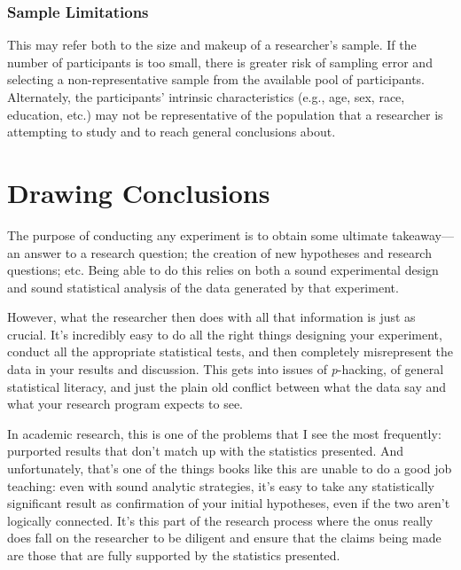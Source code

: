 \subsubsection{Sample Limitations}
This may refer both to the size and makeup of a researcher's sample. If the number of participants is too small, there is greater risk of sampling error and selecting a non-representative sample from the available pool of participants. Alternately, the participants' intrinsic characteristics (e.g., age, sex, race, education, etc.) may not be representative of the population that a researcher is attempting to study and to reach general conclusions about.

\section{Drawing Conclusions}

The purpose of conducting any experiment is to obtain some ultimate takeaway---an answer to a research question; the creation of new hypotheses and research questions; etc. Being able to do this relies on both a sound experimental design and sound statistical analysis of the data generated by that experiment.

However, what the researcher then does with all that information is just as crucial. It's incredibly easy to do all the right things designing your experiment, conduct all the appropriate statistical tests, and then completely misrepresent the data in your results and discussion. This gets into issues of \textit{p}-hacking, of general statistical literacy, and just the plain old conflict between what the data say and what your research program expects to see.

In academic research, this is one of the problems that I see the most frequently: purported results that don't match up with the statistics presented. And unfortunately, that's one of the things books like this are unable to do a good job teaching: even with sound analytic strategies, it's easy to take any statistically significant result as confirmation of your initial hypotheses, even if the two aren't logically connected. It's this part of the research process where the onus really does fall on the researcher to be diligent and ensure that the claims being made are those that are fully supported by the statistics presented.